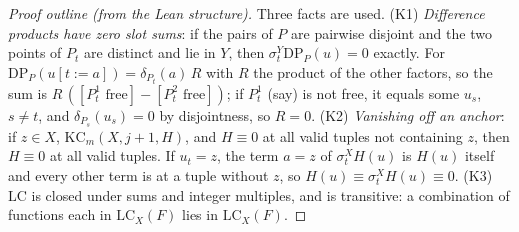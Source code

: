 \begin{proof}[Proof outline (from the Lean structure)]
\smallskip
Three facts are used.  (K1) \emph{Difference products have zero slot sums}: if the pairs of
$P$ are pairwise disjoint and the two points of $P_t$ are distinct and lie in $Y$, then
$\sigma^Y_t\mathrm{DP}_P(u)=0$ exactly.  For $\mathrm{DP}_P(u[t:=a])=\delta_{P_t}(a)\,R$ with
$R$ the product of the other factors, so the sum is
$R\,([P^1_t\text{ free}]-[P^2_t\text{ free}])$; if $P^1_t$ (say) is not free, it equals some
$u_s$, $s\ne t$, and $\delta_{P_s}(u_s)=0$ by disjointness, so $R=0$.
(K2) \emph{Vanishing off an anchor}: if $z\in X$, $\mathrm{KC}_m(X,j+1,H)$, and $H\equiv0$ at
all valid tuples not containing $z$, then $H\equiv0$ at all valid tuples.  If $u_t=z$, the
term $a=z$ of $\sigma^X_tH(u)$ is $H(u)$ itself and every other term is at a tuple without
$z$, so $H(u)\equiv\sigma^X_tH(u)\equiv0$.
(K3) $\mathrm{LC}$ is closed under sums and integer multiples, and is transitive: a combination
of functions each in $\mathrm{LC}_X(F)$ lies in $\mathrm{LC}_X(F)$.


\end{proof}

